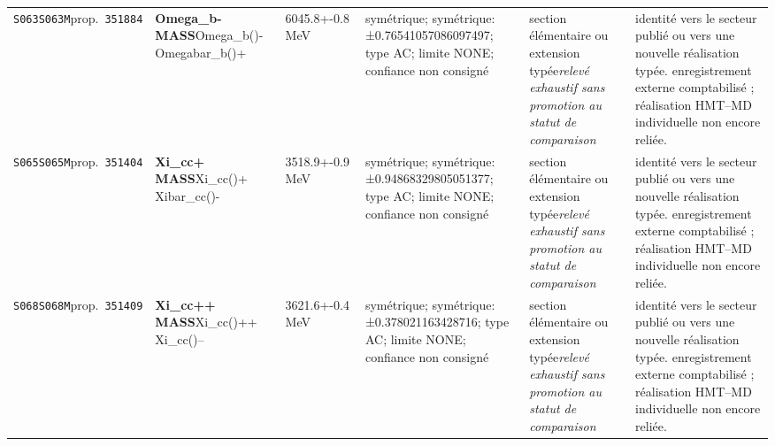 \begin{landscape}
\begin{longtable}{L{1.85cm}L{4.45cm}L{2.35cm}L{4.05cm}L{3.35cm}L{7.15cm}}
\texttt{S063}\newline \texttt{S063M}\newline prop.\ \texttt{351884} & \textbf{Omega\_\allowbreak{}b- MASS}\newline Omega\_\allowbreak{}b()- \textbar{}\allowbreak{} Omegabar\_\allowbreak{}b()+ & 6045.8+-0.8\,MeV & symétrique; symétrique: ±0.76541057086097497; type AC; limite NONE; confiance non consigné & section élémentaire ou extension typée\newline \emph{relevé exhaustif sans promotion au statut de comparaison} & identité vers le secteur publié ou vers une nouvelle réalisation typée. enregistrement externe comptabilisé ; réalisation HMT--MD individuelle non encore reliée. \\
\texttt{S065}\newline \texttt{S065M}\newline prop.\ \texttt{351404} & \textbf{Xi\_\allowbreak{}cc+ MASS}\newline Xi\_\allowbreak{}cc()+ \textbar{}\allowbreak{} Xibar\_\allowbreak{}cc()- & 3518.9+-0.9\,MeV & symétrique; symétrique: ±0.94868329805051377; type AC; limite NONE; confiance non consigné & section élémentaire ou extension typée\newline \emph{relevé exhaustif sans promotion au statut de comparaison} & identité vers le secteur publié ou vers une nouvelle réalisation typée. enregistrement externe comptabilisé ; réalisation HMT--MD individuelle non encore reliée. \\
\texttt{S068}\newline \texttt{S068M}\newline prop.\ \texttt{351409} & \textbf{Xi\_\allowbreak{}cc++ MASS}\newline Xi\_\allowbreak{}cc()++ \textbar{}\allowbreak{} Xi\_\allowbreak{}cc()-- & 3621.6+-0.4\,MeV & symétrique; symétrique: ±0.378021163428716; type AC; limite NONE; confiance non consigné & section élémentaire ou extension typée\newline \emph{relevé exhaustif sans promotion au statut de comparaison} & identité vers le secteur publié ou vers une nouvelle réalisation typée. enregistrement externe comptabilisé ; réalisation HMT--MD individuelle non encore reliée. \\

\end{longtable}
\end{landscape}
